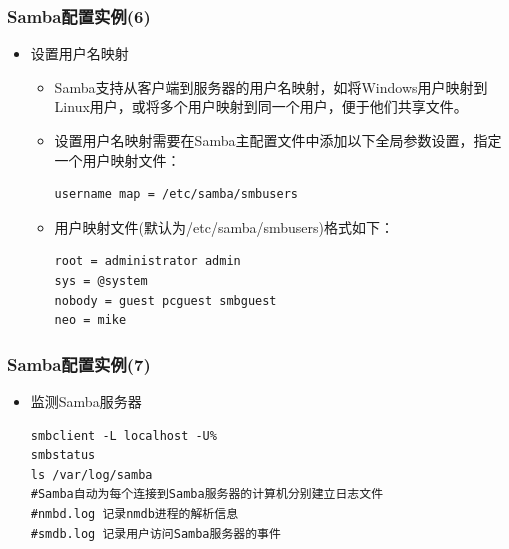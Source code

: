 \documentclass[xcolor=svgnames,presentation]{beamer}
\begin{document}
\begin{frame}[fragile]
\frametitle{Samba配置实例(6)}
\label{sec-2-14}
\begin{itemize}

\item 设置用户名映射
\label{sec-2-14-1}%
\begin{itemize}

\item Samba支持从客户端到服务器的用户名映射，如将Windows用户映射到Linux用户，或将多个用户映射到同一个用户，便于他们共享文件。
\label{sec-2-14-1-1}%

\item 设置用户名映射需要在Samba主配置文件中添加以下全局参数设置，指定一个用户映射文件：\\
\label{sec-2-14-1-2}%
\begin{verbatim}
username map = /etc/samba/smbusers
\end{verbatim}

\item 用户映射文件(默认为/etc/samba/smbusers)格式如下：\\
\label{sec-2-14-1-3}%
\begin{verbatim}
root = administrator admin
sys = @system
nobody = guest pcguest smbguest
neo = mike
\end{verbatim}
\end{itemize} %
\end{itemize} %
\end{frame}
\begin{frame}[fragile]
\frametitle{Samba配置实例(7)}
\label{sec-2-15}
\begin{itemize}

\item 监测Samba服务器\\
\label{sec-2-15-1}%
\begin{verbatim}
smbclient -L localhost -U%
smbstatus
ls /var/log/samba
#Samba自动为每个连接到Samba服务器的计算机分别建立日志文件
#nmbd.log 记录nmdb进程的解析信息
#smdb.log 记录用户访问Samba服务器的事件
\end{verbatim}
\end{itemize} %
\end{frame}
\end{document}

